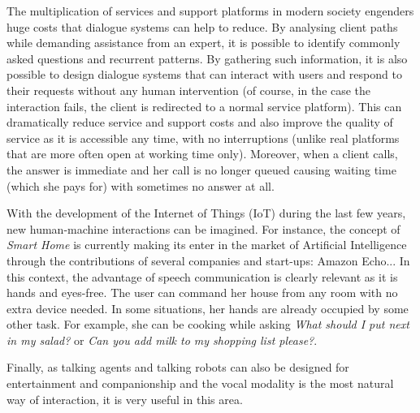         The multiplication of services and support platforms in modern society engenders huge costs that dialogue systems can help to reduce. By analysing client paths while demanding assistance from an expert, it is possible to identify commonly asked questions and recurrent patterns. By gathering such information, it is also possible to design dialogue systems that can interact with users and respond to their requests without any human intervention (of course, in the case the interaction fails, the client is redirected to a normal service platform). This can dramatically reduce service and support costs and also improve the quality of service as it is accessible any time, with no interruptions (unlike real platforms that are more often open at working time only). Moreover, when a client calls, the answer is immediate and her call is no longer queued causing waiting time (which she pays for) with sometimes no answer at all.

	With the development of the Internet of Things (IoT) during the last few years, new human-machine interactions can be imagined. For instance, the concept of \textit{Smart Home} is currently making its enter in the market of Artificial Intelligence through the contributions of several companies and start-ups: Amazon Echo... In this context, the advantage of speech communication is clearly relevant as it is hands and eyes-free. The user can command her house from any room with no extra device needed. In some situations, her hands are already occupied by some other task. For example, she can be cooking \cite{Laroche2013} while asking \textit{What should I put next in my salad?} or \textit{Can you add milk to my shopping list please?}.

        Finally, as talking agents and talking robots can also be designed for entertainment and companionship \cite{Sidner2013} and the vocal modality is the most natural way of interaction, it is very useful in this area.

